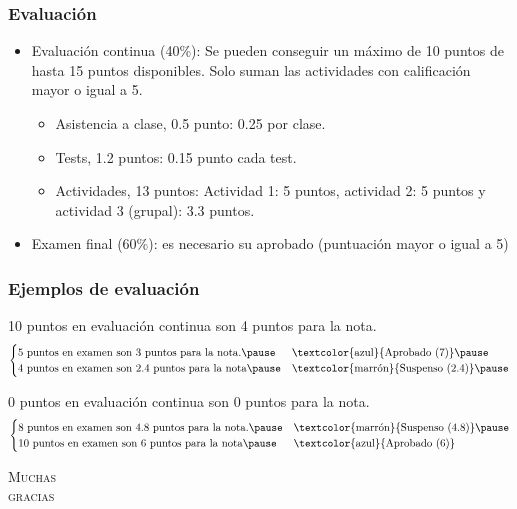 \documentclass{beamer}
\begin{document}
\begin{frame}
  \frametitle{Evaluación}
  \begin{itemize}
    \item Evaluación continua (40\%): Se pueden conseguir un máximo de 10 puntos de hasta 15 puntos disponibles. Solo suman las actividades con calificación mayor o igual a 5.\pause
          \begin{itemize}
            \item Asistencia a clase, 0.5 punto: 0.25 por clase.
            \item Tests, 1.2 puntos: 0.15 punto cada test.
            \item Actividades, 13 puntos: Actividad 1: 5 puntos, actividad 2: 5 puntos y actividad 3 (grupal): 3.3 puntos.\pause
          \end{itemize}
    \item Examen final (60\%): es necesario su aprobado (puntuación mayor o igual a 5)
  \end{itemize}
\end{frame}

\begin{frame}
  \frametitle{Ejemplos de evaluación}

  10 puntos en evaluación continua son 4 puntos para la nota.\pause
  \[
    \begin{cases}
      \text{5 puntos en examen son 3 puntos para la nota.}\pause  & \text{\textcolor{azul}{Aprobado (7)}}\pause     \\
      \text{4 puntos en examen son 2.4 puntos para la nota}\pause & \text{\textcolor{marrón}{Suspenso (2.4)}}\pause
    \end{cases}
  \]

  0 puntos en evaluación continua son 0 puntos para la nota.\pause
  \[
    \begin{cases}
      \text{8 puntos en examen son 4.8 puntos para la nota.}\pause & \text{\textcolor{marrón}{Suspenso (4.8)}}\pause \\
      \text{10 puntos en examen son 6 puntos para la nota}\pause   & \text{\textcolor{azul}{Aprobado (6)}}
    \end{cases}
  \]
\end{frame}

\begin{frame}
  \begin{center}
    \Huge\scshape\textcolor{texto}{Muchas\\gracias}
  \end{center}
\end{frame}
\end{document}

